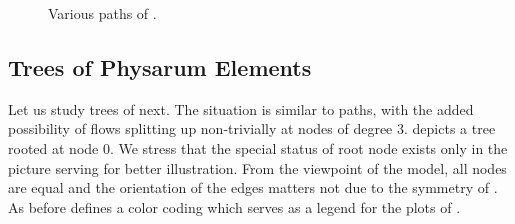 		\begin{figure}
			\centering
			\qquad
			\newline
			\qquad
			\newline
			\qquad
			\newline
			\qquad
			
			\caption[Simulation - Paths]{Various paths of \Pes.}
			\label{fig:paths}
		\end{figure}

		\FloatBarrier

	\subsection{Trees of Physarum Elements}
		
		Let us study trees of \Pes next. The situation is similar to paths, with the added possibility of flows splitting up non-trivially at nodes of degree $3$.  depicts a tree rooted at node $0$. We stress that the special status of root node exists only in the picture serving for better illustration. From the viewpoint of the model, all nodes are equal and the orientation of the edges matters not due to the symmetry of \Pes. As before  defines a color coding which serves as a legend for the plots of .

